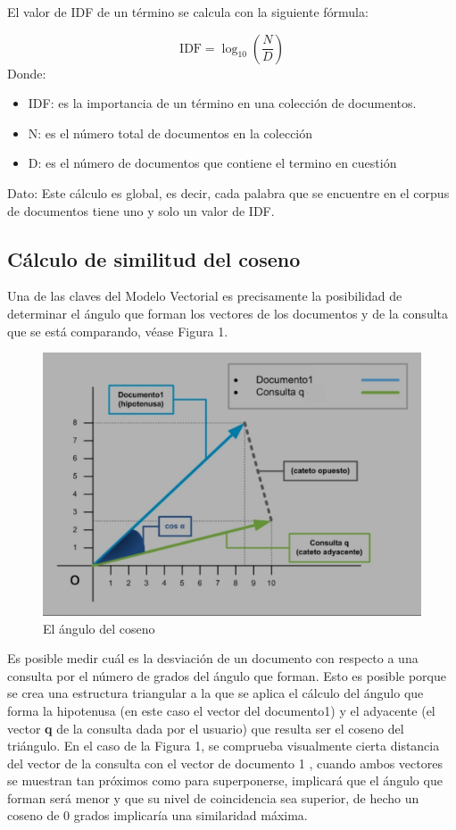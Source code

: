 \documentclass[a4paper,12pt]{article}
\begin{document}
El valor de IDF de un término se calcula con la siguiente fórmula:

\begin{equation}
    \mathrm{IDF} = \log_{10} (\frac{N}{D})
\end{equation}
Donde:
\begin{itemize}
    \item{IDF: es la importancia de un término en una colección de documentos.}
    \item{N: es el número total de documentos en la colección}
    \item{D: es el número de documentos que contiene el termino en cuestión}
\end{itemize}

Dato: Este cálculo es global, es decir, cada palabra que se encuentre en el corpus de documentos tiene uno y solo un valor de IDF.

\subsection{Cálculo de similitud del coseno}
Una de las claves del Modelo Vectorial es precisamente la posibilidad de determinar el ángulo que forman los vectores de los documentos y de la consulta que se está comparando, véase Figura 1.

\begin{figure}[h]
    \center
    \includegraphics[width=14cm]{grafica.png}
    \caption{El ángulo del coseno}
\end{figure}

Es posible medir cuál es la desviación de un documento con respecto a una consulta por el número de grados del ángulo que forman. Esto es posible porque se crea una estructura triangular a la que se aplica el cálculo del ángulo que forma la hipotenusa (en este caso el vector del documento1) y el adyacente (el vector \textbf{q} de la consulta dada por el usuario) que resulta ser el coseno del triángulo. En el caso de la Figura 1, se comprueba visualmente cierta distancia del vector de la consulta con el vector de documento 1 , cuando ambos vectores se muestran tan próximos como para superponerse, implicará que el ángulo que forman será menor y que su nivel de coincidencia sea superior, de hecho un coseno de 0 grados implicaría una similaridad máxima.
\end{document}

